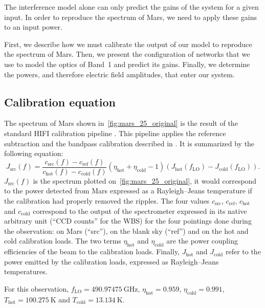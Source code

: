 \begin{refsection}
The interference model alone can only predict the gains of the system for a given input.
In order to reproduce the spectrum of Mars, we need to apply these gains to an input power.


First, we describe how we must calibrate the output of our model to reproduce the spectrum of Mars.
Then, we present the configuration of networks that we use to model the optics of Band~1 and predict its gains.
Finally, we determine the powers, and therefore electric field amplitudes, that enter our system.




\subsection{Calibration equation}

The spectrum of Mars shown in~\cref{fig:mars_25_original} is the result of the standard HIFI calibration pipeline \parencite{hifiobserversmanual}.
This pipeline applies the reference subtraction and the bandpass calibration described in \textcite{ossenkopf2002intensity}.
It is summarized by the following equation:
\begin{equation}
    J_\text{src}(f)%
    = 
    \frac{
        c_\text{src}(f) - c_\text{ref}(f)
    }{
        c_\text{hot}(f) - c_\text{cold}(f)
    }
    (\eta_\text{hot} + \eta_\text{cold} - 1)
    (
        J_\text{hot}(f_\text{LO}) - J_\text{cold}(f_\text{LO})
    )
    \text{.}
    \label{eq:mars_calibration}
\end{equation}
$J_\text{src}(f)$ is the spectrum plotted on~\cref{fig:mars_25_original}, it would correspond to the power detected from Mars expressed as a Rayleigh--Jeans temperature if the calibration had properly removed the ripples.
The four values $c_\text{src}$, $c_\text{ref}$, $c_\text{hot}$ and $c_\text{cold}$ correspond to the output of the spectrometer expressed in its native arbitrary unit (``CCD counts'' for the WBS) for the four pointings done during the observation:
on Mars (``src''), on the blank sky (``ref'') and on the hot and cold calibration loads.
The two terms $\eta_\text{hot}$ and $\eta_\text{cold}$ are the power coupling efficiencies of the beam to the calibration loads.
Finally, $J_\text{hot}$ and $J_\text{cold}$ refer to the power emitted by the calibration loads, expressed as Rayleigh--Jeans temperatures.

For this observation,
$f_\text{LO} = \SI{490.97475}{\giga\hertz}$,
$\eta_\text{hot} = 0.959$,
$\eta_\text{cold} = 0.991$,
$T_\text{hot} = \SI{100.275}{\kelvin}$ and
$T_\text{cold} = \SI{13.134}{\kelvin}$.


\end{refsection}
